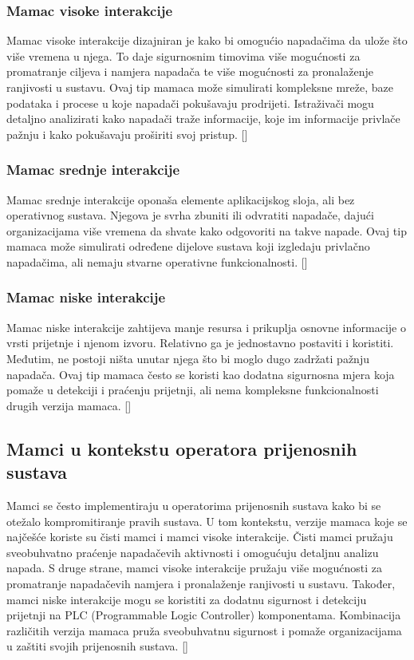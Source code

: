 \documentclass[times, utf8, zavrsni]{fer}
\begin{document}
\subsubsection{Mamac visoke interakcije}
Mamac visoke interakcije dizajniran je kako bi omogućio napadačima da ulože što više vremena u njega. To daje sigurnosnim timovima više mogućnosti za promatranje ciljeva i namjera napadača te više mogućnosti za pronalaženje ranjivosti u sustavu. Ovaj tip mamaca može simulirati kompleksne mreže, baze podataka i procese u koje napadači pokušavaju prodrijeti. Istraživači mogu detaljno analizirati kako napadači traže informacije, koje im informacije privlače pažnju i kako pokušavaju proširiti svoj pristup. [\cite{honeypot-def}]

\subsubsection{Mamac srednje interakcije}
Mamac srednje interakcije oponaša elemente aplikacijskog sloja, ali bez operativnog sustava. Njegova je svrha zbuniti ili odvratiti napadače, dajući organizacijama više vremena da shvate kako odgovoriti na takve napade. Ovaj tip mamaca može simulirati određene dijelove sustava koji izgledaju privlačno napadačima, ali nemaju stvarne operativne funkcionalnosti. [\cite{honeypot-def}]

\subsubsection{Mamac niske interakcije}
Mamac niske interakcije zahtijeva manje resursa i prikuplja osnovne informacije o vrsti prijetnje i njenom izvoru. Relativno ga je jednostavno postaviti i koristiti. Međutim, ne postoji ništa unutar njega što bi moglo dugo zadržati pažnju napadača. Ovaj tip mamaca često se koristi kao dodatna sigurnosna mjera koja pomaže u detekciji i praćenju prijetnji, ali nema kompleksne funkcionalnosti drugih verzija mamaca. [\cite{honeypot-def}]

\subsection{Mamci u kontekstu operatora prijenosnih sustava}
Mamci se često implementiraju u operatorima prijenosnih sustava kako bi se otežalo kompromitiranje pravih sustava. U tom kontekstu, verzije mamaca koje se najčešće koriste su čisti mamci i mamci visoke interakcije. Čisti mamci pružaju sveobuhvatno praćenje napadačevih aktivnosti i omogućuju detaljnu analizu napada. S druge strane, mamci visoke interakcije pružaju više mogućnosti za promatranje napadačevih namjera i pronalaženje ranjivosti u sustavu. Također, mamci niske interakcije mogu se koristiti za dodatnu sigurnost i detekciju prijetnji na PLC (Programmable Logic Controller) komponentama. Kombinacija različitih verzija mamaca pruža sveobuhvatnu sigurnost i pomaže organizacijama u zaštiti svojih prijenosnih sustava. [\cite{honeypot-def}]
\end{document}
